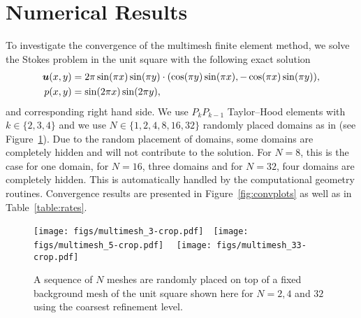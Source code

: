 \documentclass[graybox]{svmult}
\begin{document}
\section{Numerical Results}

To investigate the convergence of the multimesh finite element method, we solve the Stokes problem in the unit square with the following exact solution
\begin{align}
  \label{eq:exactu}
  \bm{u}(x, y) &= 2 \pi \sin(\pi x) \sin(\pi y) \cdot
  ( \cos(\pi y) \sin(\pi x) , -\cos(\pi x) \sin(\pi y) ), \\
  \label{eq:exactp}
  p(x, y) &= \sin(2 \pi x) \sin(2 \pi y),
\end{align}
and corresponding right hand side. We use $P_kP_{k-1}$ Taylor--Hood elements with $k\in \{2,3,4\}$ and we use $N\in \{1,2,4,8,16,32\}$ randomly placed domains as in \cite{mmfem-1} (see Figure~\ref{fig:poisson_meshes}). Due to the random placement of domains, some domains are completely hidden and will not contribute to the solution. For $N=8$, this is the case for one domain, for $N=16$, three domains and for $N=32$, four domains are completely hidden. This is automatically handled by the computational geometry routines. Convergence results are presented in Figure~\ref{fig:convplots} as well as in Table~\ref{table:rates}.

\begin{figure}
  \begin{center}
    \texttt{[image: figs/multimesh\_3-crop.pdf]}\ \
    \texttt{[image: figs/multimesh\_5-crop.pdf]}\ \ %
    \texttt{[image: figs/multimesh\_33-crop.pdf]}
  \end{center}
  \caption{A sequence of $N$ meshes are randomly placed on top of a fixed background mesh of the unit square shown here for $N=2, 4$ and $32$ using the coarsest refinement level.}
  \label{fig:poisson_meshes}
\end{figure}
\end{document}
